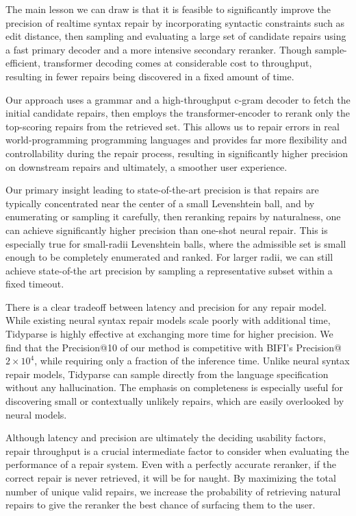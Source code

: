 \documentclass[sigplan,review,acmsmall,nonacm,screen,anonymous]{acmart}\settopmatter{printfolios=false,printccs=false,printacmref=false}
\begin{document}
The main lesson we can draw is that it is feasible to significantly improve the precision of realtime syntax repair by incorporating syntactic constraints such as edit distance, then sampling and evaluating a large set of candidate repairs using a fast primary decoder and a more intensive secondary reranker. Though sample-efficient, transformer decoding comes at considerable cost to throughput, resulting in fewer repairs being discovered in a fixed amount of time.

Our approach uses a grammar and a high-throughput c-gram decoder to fetch the initial candidate repairs, then employs the transformer-encoder to rerank only the top-scoring repairs from the retrieved set. This allows us to repair errors in real world-programming programming languages and provides far more flexibility and controllability during the repair process, resulting in significantly higher precision on downstream repairs and ultimately, a smoother user experience.

Our primary insight leading to state-of-the-art precision is that repairs are typically concentrated near the center of a small Levenshtein ball, and by enumerating or sampling it carefully, then reranking repairs by naturalness, one can achieve significantly higher precision than one-shot neural repair. This is especially true for small-radii Levenshtein balls, where the admissible set is small enough to be completely enumerated and ranked. For larger radii, we can still achieve state-of-the art precision by sampling a representative subset within a fixed timeout.

There is a clear tradeoff between latency and precision for any repair model. While existing neural syntax repair models scale poorly with additional time, Tidyparse is highly effective at exchanging more time for higher precision. We find that the Precision@10 of our method is competitive with BIFI's Precision@$2\times 10^4$, while requiring only a fraction of the inference time. Unlike neural syntax repair models, Tidyparse can sample directly from the language specification without any hallucination. The emphasis on completeness is especially useful for discovering small or contextually unlikely repairs, which are easily overlooked by neural models.

Although latency and precision are ultimately the deciding usability factors, repair throughput is a crucial intermediate factor to consider when evaluating the performance of a repair system. Even with a perfectly accurate reranker, if the correct repair is never retrieved, it will be for naught. By maximizing the total number of unique valid repairs, we increase the probability of retrieving natural repairs to give the reranker the best chance of surfacing them to the user.
\end{document}
